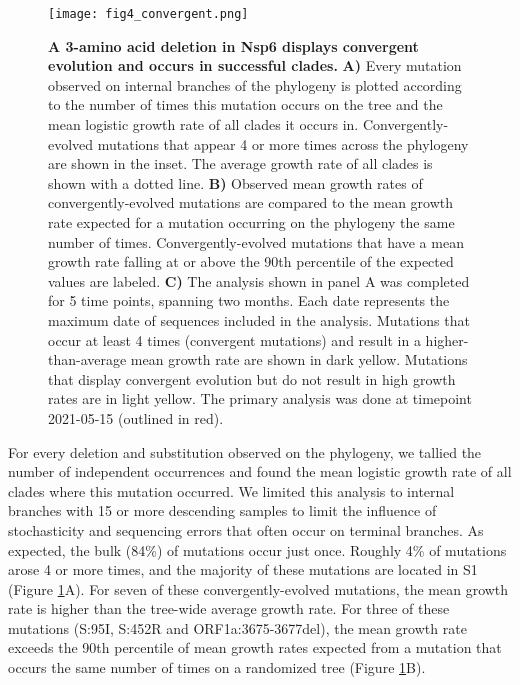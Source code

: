 \documentclass[11pt,oneside,letterpaper]{article}
\begin{document}
\begin{figure}[h!]
	\centerline{\texttt{[image: fig4\_convergent.png]}}
	\caption{\textbf{A 3-amino acid deletion in Nsp6 displays convergent evolution and occurs in successful clades.}
	\textbf{A)} Every mutation observed on internal branches of the phylogeny is plotted according to the number of times this mutation occurs on the tree and the mean logistic growth rate of all clades it occurs in.
	Convergently-evolved mutations that appear 4 or more times across the phylogeny are shown in the inset. The average growth rate of all clades is shown with a dotted line.
	\textbf{B)} Observed mean growth rates of convergently-evolved mutations are compared to the mean growth rate expected for a mutation occurring on the phylogeny the same number of times. Convergently-evolved mutations that have a mean growth rate falling at or above the 90th percentile of the expected values are labeled.
	\textbf{C)} The analysis shown in panel A was completed for 5 time points, spanning two months. Each date represents the maximum date of sequences included in the analysis.
	Mutations that occur at least 4 times (convergent mutations) and result in a higher-than-average mean growth rate are shown in dark yellow.
	Mutations that display convergent evolution but do not result in high growth rates are in light yellow.
	The primary analysis was done at timepoint 2021-05-15 (outlined in red).
	}
	\label{fig:convergent}
\end{figure}

For every deletion and substitution observed on the phylogeny, we tallied the number of independent occurrences and found the mean logistic growth rate of all clades where this mutation occurred.
We limited this analysis to internal branches with 15 or more descending samples to limit the influence of stochasticity and sequencing errors that often occur on terminal branches. 
As expected, the bulk (84\%) of mutations occur just once.
Roughly 4\% of mutations arose 4 or more times, and the majority of these mutations are located in S1 (Figure \ref{fig:convergent}A).
For seven of these convergently-evolved mutations, the mean growth rate is higher than the tree-wide average growth rate.
For three of these mutations (S:95I, S:452R and ORF1a:3675-3677del), the mean growth rate exceeds the 90th percentile of mean growth rates expected from a mutation that occurs the same number of times on a randomized tree (Figure \ref{fig:convergent}B).
\end{document}
